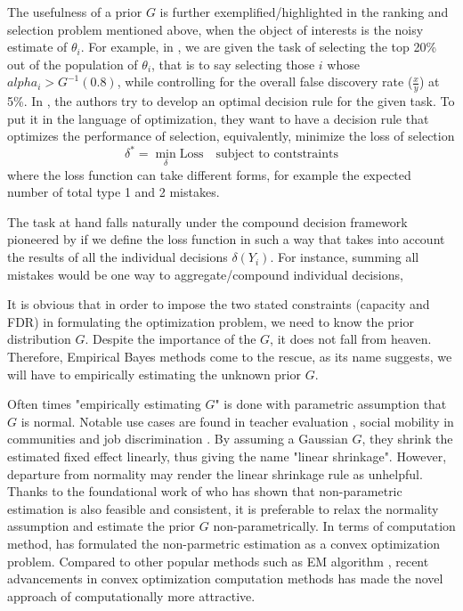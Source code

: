 \documentclass[12pt]{article}
\begin{document}
The usefulness of a prior $G$ is further exemplified/highlighted in the ranking
and selection problem mentioned above, when the object of interests is the
noisy estimate of $\theta_i$. For example, in \cite{gu2023invidious}, we are
given the task of selecting the top 20\% out of the population of $\theta_i$,
that is to say selecting those $i$ whose $alpha_i>G^{-1}(0.8)$, while
controlling for the overall false discovery rate ($\frac{x}{y}$) at 5\%. In
\cite{gu2023invidious}, the authors try to develop an optimal decision rule for
the given task. To put it in the language of optimization, they want to have a
decision rule that optimizes the performance of selection, equivalently,
minimize the loss of selection
\begin{equation*}
    \delta^* = \min_{\delta} \text{Loss} \quad \text{subject to contstraints}
\end{equation*}
where the loss function can take different forms, for example the
expected number of total type 1 and 2 mistakes.

The task at hand falls naturally under the compound decision framework
pioneered by \cite{herbert1956empirical} if we define the loss function in such
a way that takes into account the results of all the individual decisions
$\delta(Y_i)$. For instance, summing all mistakes would be one way to
aggregate/compound individual decisions,

It is obvious that in order to impose the two stated constraints (capacity and
FDR) in formulating the optimization problem, we need to know the prior
distribution $G$. Despite the importance of the $G$, it does not fall from
heaven. Therefore, Empirical Bayes methods come to the rescue, as its name
suggests, we will have to empirically estimating the unknown prior $G$.

Often times "empirically estimating \(G\)" is done with parametric assumption
that \(G\) is normal. Notable use cases are found in teacher evaluation
\cite{chetty2014measuring}, social mobility in communities
\cite{chetty2018impacts} and job discrimination \cite{kline2021reasonable}. By
assuming a Gaussian $G$, they shrink the estimated fixed effect linearly, thus
giving the name "linear shrinkage". However, departure from normality may
render the linear shrinkage rule as unhelpful. Thanks to the foundational work
of \cite{kiefer1956consistency} who has shown that non-parametric estimation is
also feasible and consistent, it is preferable to relax the normality
assumption and estimate the prior $G$ non-parametrically. In terms of
computation method, \cite{koenker2014convex} has formulated the non-parmetric
estimation as a convex optimization problem. Compared to other popular methods
such as EM algorithm \cite{laird1978nonparametric}, recent advancements in
convex optimization computation methods \cite{andersen2010mosek} has made the
novel approach of \cite{koenker2014convex} computationally more attractive.
\end{document}

